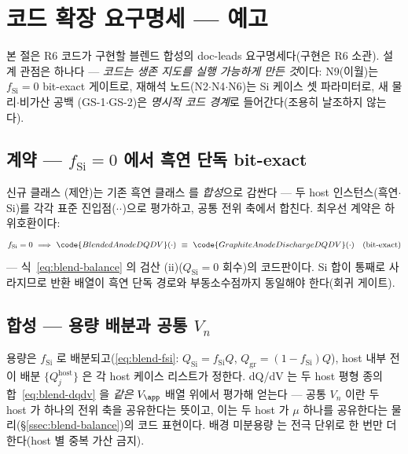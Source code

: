 \section{코드 확장 요구명세 ---  예고}\label{sec:si-code}
본 절은 R6 코드가 구현할 블렌드 합성의 doc-leads 요구명세다(구현은 R6 소관). 설계 관점은 하나다 ---
\emph{코드는 생존 지도를 실행 가능하게 만든 것}이다: N9(이월)는 $f_\mathrm{Si}{=}0$ bit-exact
게이트로, 재해석 노드(N2$\cdot$N4$\cdot$N6)는 Si 케이스 셋 파라미터로, 새 물리$\cdot$비가산 공백
(GS-1$\cdot$GS-2)은 \emph{명시적 코드 경계}로 들어간다(조용히 날조하지 않는다).

\subsection{계약 --- $f_\mathrm{Si}{=}0$ 에서 흑연 단독 bit-exact}\label{ssec:code-contract}
신규 클래스 (제안)는 기존 흑연 클래스
 를 \emph{합성}으로 감싼다 --- 두 host 인스턴스(흑연$\cdot$Si)를 각각
표준 진입점($\cdot$$\cdot$)으로 평가하고, 공통 전위 축에서
합친다. 최우선 계약은 하위호환이다:
\begin{equation}
f_\mathrm{Si}=0\ \Longrightarrow\ \code{BlendedAnodeDQDV}(\cdot)\ \equiv\ \code{GraphiteAnodeDischargeDQDV}(\cdot)
\quad(\text{bit-exact})
\label{eq:si-code-bitexact}
\end{equation}
--- 식~\eqref{eq:blend-balance} 의 검산 (ii)($Q_\mathrm{Si}{=}0$ 회수)의 코드판이다. Si 합이 통째로
사라지므로 반환 배열이 흑연 단독 경로와 부동소수점까지 동일해야 한다(회귀 게이트).

\subsection{합성 --- 용량 배분과 공통 $V_n$}\label{ssec:code-synth}
용량은 $f_\mathrm{Si}$ 로 배분되고(\eqref{eq:blend-fsi}: $Q_\mathrm{Si}{=}f_\mathrm{Si}Q$,
$Q_\mathrm{gr}{=}(1{-}f_\mathrm{Si})Q$), host 내부 전이 배분 $\{Q_j^{\mathrm{host}}\}$ 은 각 host 케이스
리스트가 정한다. dQ/dV 는 두 host 평형 종의 합~\eqref{eq:blend-dqdv} 을 \emph{같은} $V_\app$ 배열
위에서 평가해 얻는다 --- 공통 $V_n$ 이란 두 host 가 하나의 전위 축을 공유한다는 뜻이고, 이는 두 host 가
$\mu$ 하나를 공유한다는 물리(\S\ref{ssec:blend-balance})의 코드 표현이다. 배경 미분용량  는
전극 단위로 한 번만 더한다(host 별 중복 가산 금지).


